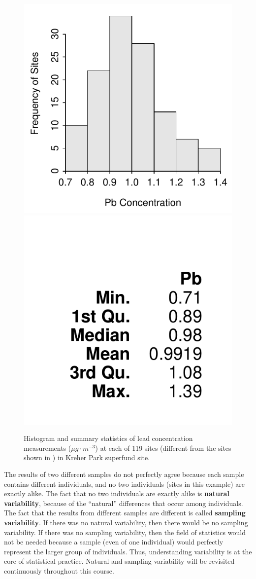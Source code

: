 \documentclass[10pt,openany]{book}\usepackage[]{graphicx}\usepackage[]{color}
\newenvironment{knitrout}{}{} %
\begin{document}
\begin{knitrout}
\color{fgcolor}\begin{figure}[hbtp]

{\centering \includegraphics[width=.4\linewidth]{Figs/KreherParkPbhist1-1} 
\includegraphics[width=.4\linewidth]{Figs/KreherParkPbhist1-2} 

}

\caption[Kreher Park 1]{Histogram and summary statistics of lead concentration measurements ($\mu g \cdot m^{-3}$) at each of 119 sites (different from the sites shown in ) in Kreher Park superfund site.}\label{fig:KreherParkPbhist1}
\end{figure}


\end{knitrout}

\vspace{18pt}
The results of two different samples do not perfectly agree because each sample contains different individuals, and no two individuals (sites in this example) are exactly alike.  The fact that no two individuals are exactly alike is \textbf{natural variability}, because of the ``natural'' differences that occur among individuals.  The fact that the results from different samples are different is called \textbf{sampling variability}.  If there was no natural variability, then there would be no sampling variability.  If there was no sampling variability, then the field of statistics would not be needed because a sample (even of one individual) would perfectly represent the larger group of individuals.  Thus, understanding variability is at the core of statistical practice.  Natural and sampling variability will be revisited continuously throughout this course.
\end{document}
